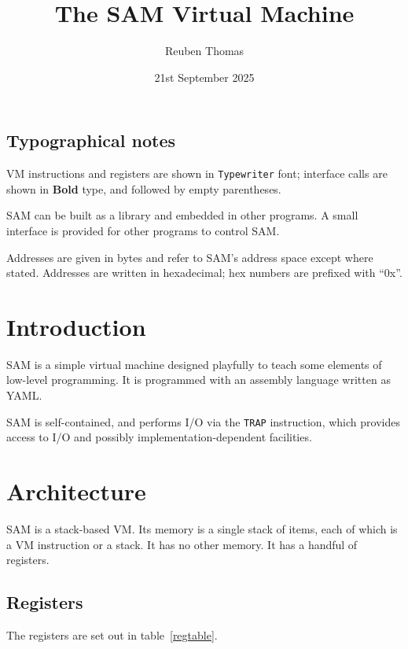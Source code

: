 \documentclass[english]{scrartcl}
\title{The SAM Virtual Machine}
\author{Reuben Thomas}
\date{21st September 2025}
\begin{document}
\maketitle

\subsection*{Typographical notes}

VM instructions and registers are shown in {\tt Typewriter} font; interface calls are shown in \textbf{Bold} type, and followed by empty parentheses.

SAM can be built as a library and embedded in other programs. A small interface is provided for other programs to control SAM.

Addresses are given in bytes and refer to SAM’s address space except where stated. Addresses are written in hexadecimal; hex numbers are prefixed with “0x”.


\section{Introduction}

SAM is a simple virtual machine designed playfully to teach some elements of low-level programming. It is programmed with an assembly language written as YAML.

SAM is self-contained, and performs I/O via the {\tt TRAP} instruction, which provides access to I/O and possibly implementation-dependent facilities.


\section{Architecture}

SAM is a stack-based VM. Its memory is a single stack of items, each of which is a VM instruction or a stack. It has no other memory. It has a handful of registers.


\subsection{Registers}
\label{registers}

The registers are set out in table~\ref{regtable}.
\end{document}
